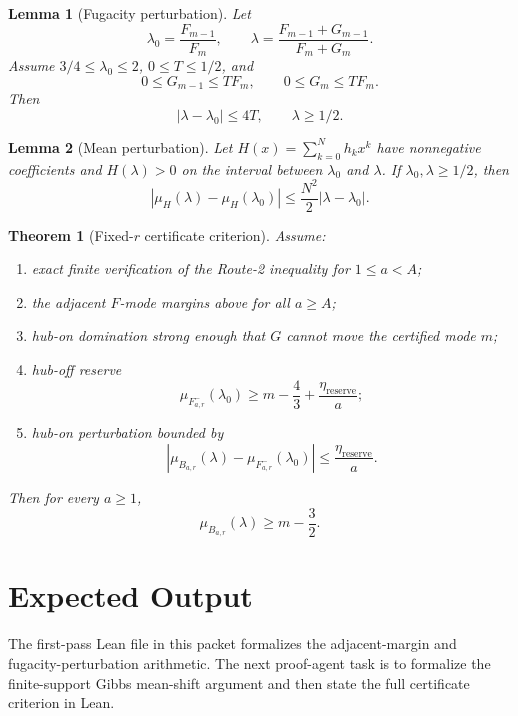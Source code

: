 \documentclass[11pt]{article}
\newtheorem{theorem}{Theorem}
\newtheorem{lemma}{Lemma}
\begin{document}
\begin{lemma}[Fugacity perturbation]
Let
\[
  \lambda_0=\frac{F_{m-1}}{F_m},\qquad
  \lambda=\frac{F_{m-1}+G_{m-1}}{F_m+G_m}.
\]
Assume \(3/4\le\lambda_0\le 2\), \(0\le T\le 1/2\), and
\[
  0\le G_{m-1}\le TF_m,\qquad 0\le G_m\le TF_m.
\]
Then
\[
  |\lambda-\lambda_0|\le 4T,\qquad \lambda\ge 1/2.
\]
\end{lemma}

\begin{lemma}[Mean perturbation]
Let \(H(x)=\sum_{k=0}^N h_kx^k\) have nonnegative coefficients and
\(H(\lambda)>0\) on the interval between \(\lambda_0\) and \(\lambda\).
If \(\lambda_0,\lambda\ge 1/2\), then
\[
  |\mu_H(\lambda)-\mu_H(\lambda_0)|
  \le \frac{N^2}{2}|\lambda-\lambda_0|.
\]
\end{lemma}

\begin{theorem}[Fixed-\(r\) certificate criterion]
Assume:
\begin{enumerate}
  \item exact finite verification of the Route-2 inequality for \(1\le a<A\);
  \item the adjacent \(F\)-mode margins above for all \(a\ge A\);
  \item hub-on domination strong enough that \(G\) cannot move the certified
        mode \(m\);
  \item hub-off reserve
        \[
          \mu_{F^-_{a,r}}(\lambda_0)
          \ge m-\frac43+\frac{\eta_{\mathrm{reserve}}}{a};
        \]
  \item hub-on perturbation bounded by
        \[
          |\mu_{B_{a,r}}(\lambda)-\mu_{F^-_{a,r}}(\lambda_0)|
          \le \frac{\eta_{\mathrm{reserve}}}{a}.
        \]
\end{enumerate}
Then for every \(a\ge1\),
\[
  \mu_{B_{a,r}}(\lambda)\ge m-\frac32.
\]
\end{theorem}

\section{Expected Output}

The first-pass Lean file in this packet formalizes the adjacent-margin and
fugacity-perturbation arithmetic.  The next proof-agent task is to formalize the
finite-support Gibbs mean-shift argument and then state the full certificate
criterion in Lean.
\end{document}
